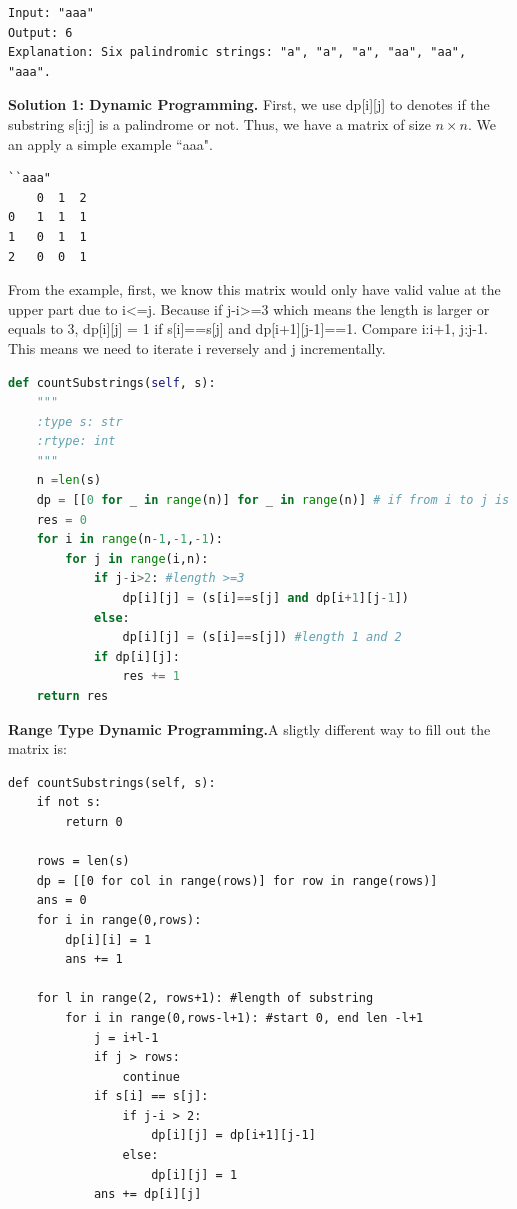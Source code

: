 \documentclass[../main.tex]{subfiles}
\begin{document}
\begin{examples}[resume]
\begin{lstlisting}[numbers=none]
Input: "aaa"
Output: 6
Explanation: Six palindromic strings: "a", "a", "a", "aa", "aa", "aaa".
\end{lstlisting}
\textbf{Solution 1: Dynamic Programming.} First, we use dp[i][j] to denotes if the substring s[i:j] is a palindrome or not. Thus, we have a matrix of size $n\times n$. We an apply a simple example ``aaa".
\begin{lstlisting}[numbers=none]
``aaa"
    0  1  2
0   1  1  1
1   0  1  1
2   0  0  1
\end{lstlisting}
From the example, first, we know this matrix would only have valid value at the upper part due to i<=j. Because if j-i>=3 which means the length is larger or equals to 3, dp[i][j] = 1 if s[i]==s[j] and dp[i+1][j-1]==1. Compare i:i+1, j:j-1. This means we need to iterate i reversely and j incrementally.
\begin{lstlisting}[language=Python]
def countSubstrings(self, s):
    """
    :type s: str
    :rtype: int
    """
    n =len(s)
    dp = [[0 for _ in range(n)] for _ in range(n)] # if from i to j is a palindrome
    res = 0
    for i in range(n-1,-1,-1):
        for j in range(i,n):                
            if j-i>2: #length >=3
                dp[i][j] = (s[i]==s[j] and dp[i+1][j-1])
            else:
                dp[i][j] = (s[i]==s[j]) #length 1 and 2
            if dp[i][j]:
                res += 1
    return res
\end{lstlisting}
\textbf{Range Type Dynamic Programming.}A sligtly different way to fill out the matrix is:
\begin{lstlisting}
def countSubstrings(self, s):
    if not s:
        return 0
    
    rows = len(s)
    dp = [[0 for col in range(rows)] for row in range(rows)]
    ans = 0
    for i in range(0,rows):
        dp[i][i] = 1
        ans += 1
    
    for l in range(2, rows+1): #length of substring
        for i in range(0,rows-l+1): #start 0, end len -l+1
            j = i+l-1
            if j > rows:
                continue
            if s[i] == s[j]:
                if j-i > 2:
                    dp[i][j] = dp[i+1][j-1]
                else:
                    dp[i][j] = 1
            ans += dp[i][j]
                

\end{lstlisting}
\end{examples}
\end{document}
